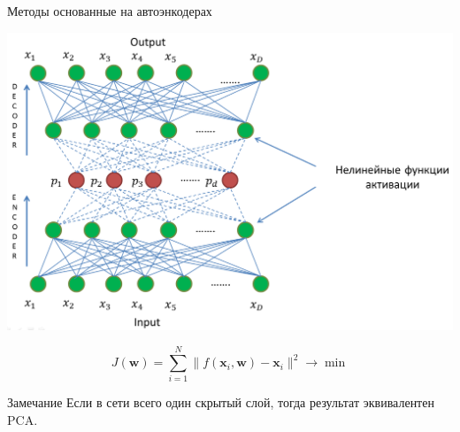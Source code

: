 \documentclass[10pt]{beamer}
\begin{document}
\begin{frame}{Методы основанные на автоэнкодерах}
\begin{center}
    \includegraphics[scale=0.15]{images/autoencoder.png}
\end{center}
\[
    J(\mathbf{w}) = \sum \limits _{i=1}^{N} \| f(\mathbf{x}_i, \mathbf{w}) -
    \mathbf{x}_i \|^2 \rightarrow \min
\]
\begin{block}{Замечание}
Если в сети всего один скрытый слой, тогда результат эквивалентен PCA.
\end{block}
\end{frame}
\end{document}
